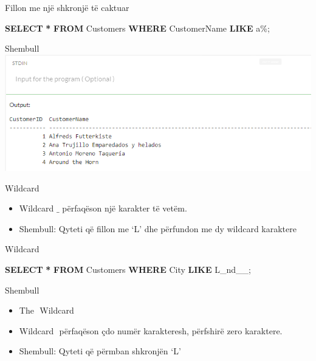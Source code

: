 \documentclass[
  ignorenonframetext,
]{beamer}
\newenvironment{Shaded}{\begin{snugshade}}{\end{snugshade}}
\newcommand{\KeywordTok}[1]{\textcolor[rgb]{0.13,0.29,0.53}{\textbf{#1}}}
\newcommand{\NormalTok}[1]{#1}
\newcommand{\OperatorTok}[1]{\textcolor[rgb]{0.81,0.36,0.00}{\textbf{#1}}}
\newcommand{\StringTok}[1]{\textcolor[rgb]{0.31,0.60,0.02}{#1}}
\begin{document}
\begin{frame}[fragile]{Fillon me një shkronjë të caktuar}
\label{fillon-me-njuxeb-shkronjuxeb-tuxeb-caktuar}
\begin{Shaded}
\begin{Highlighting}[]
\KeywordTok{SELECT} \OperatorTok{*}
\KeywordTok{FROM}\NormalTok{ Customers}
\KeywordTok{WHERE}\NormalTok{ CustomerName }\KeywordTok{LIKE} \StringTok{\textquotesingle{}a\%\textquotesingle{}}\NormalTok{;}
\end{Highlighting}
\end{Shaded}
\end{frame}

\begin{frame}{Shembull}
\label{shembull-4}
\includegraphics{./Figs/query61.png}
\end{frame}

\begin{frame}{Wildcard}
\label{wildcard}
\begin{itemize}
\item
  Wildcard \(\_\) përfaqëson një karakter të vetëm.
\item
  Shembull: Qyteti që fillon me `L' dhe përfundon me dy wildcard
  karaktere
\end{itemize}
\end{frame}

\begin{frame}[fragile]{Wildcard}
\label{wildcard-1}
\begin{Shaded}
\begin{Highlighting}[]
\KeywordTok{SELECT} \OperatorTok{*}
\KeywordTok{FROM}\NormalTok{ Customers}
\KeywordTok{WHERE}\NormalTok{ City }\KeywordTok{LIKE} \StringTok{\textquotesingle{}L\_nd\_\_\textquotesingle{}}\NormalTok{;}
\end{Highlighting}
\end{Shaded}
\end{frame}

\begin{frame}{Shembull}
\label{shembull-5}
\begin{itemize}
\item
  The \(%
  \) Wildcard
\item
  Wildcard \(%
  \) përfaqëson çdo numër karakteresh, përfshirë zero karaktere.
\item
  Shembull: Qyteti që përmban shkronjën `L'
\end{itemize}
\end{frame}
\end{document}

